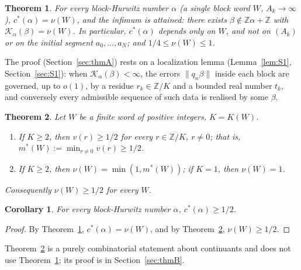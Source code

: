 \documentclass[11pt]{amsart}
\newtheorem{introthm}{Theorem}
\newtheorem{corollary}[theorem]{Corollary}
\theoremstyle{definition}
\theoremstyle{remark}
\newcommand{\Z}{\mathbb{Z}}
\newcommand{\dist}[1]{\lVert #1\rVert}
\newcommand{\KL}{\mathcal{K}}
\begin{document}
\begin{introthm}\label{thm:A}
For every block-Hurwitz number $\alpha$ (a single block word $W$, $A_k\to\infty$), $c^*(\alpha)=\nu(W)$, and
the infimum is attained: there exists $\beta\notin\Z\alpha+\Z$ with $\KL_\alpha(\beta)=\nu(W)$. In particular,
$c^*(\alpha)$ depends only on $W$, and not on $(A_k)$ or on the initial segment $a_0,\dots,a_N$; and
$1/4\le\nu(W)\le1$.
\end{introthm}

The proof (Section~\ref{sec:thmA}) rests on a localization lemma (Lemma~\ref{lem:S1}, Section~\ref{sec:S1}):
when $\KL_\alpha(\beta)<\infty$, the errors $\dist{q_n\beta}$ inside each block are governed, up to $o(1)$, by a
residue $r_k\in\Z/K$ and a bounded real number $t_k$, and conversely every admissible sequence of such data
is realised by some $\beta$.

\begin{introthm}\label{thm:B}
Let $W$ be a finite word of positive integers, $K=K(W)$.
\begin{enumerate}
\item[(i)] If $K\ge2$, then $v(r)\ge1/2$ for every $r\in\Z/K$, $r\ne0$; that is,
$m^*(W):=\min_{r\ne0}v(r)\ge1/2$.
\item[(ii)] If $K\ge2$, then $\nu(W)=\min(1,m^*(W))$; if $K=1$, then $\nu(W)=1$.
\end{enumerate}
Consequently $\nu(W)\ge1/2$ for every $W$.
\end{introthm}

\begin{corollary}\label{cor:half}
For every block-Hurwitz number $\alpha$, $c^*(\alpha)\ge1/2$.
\end{corollary}

\begin{proof}
By Theorem~\ref{thm:A}, $c^*(\alpha)=\nu(W)$, and by Theorem~\ref{thm:B}, $\nu(W)\ge1/2$.
\end{proof}

Theorem~\ref{thm:B} is a purely combinatorial statement about continuants and does not use
Theorem~\ref{thm:A}; its proof is in Section~\ref{sec:thmB}.
\end{document}
